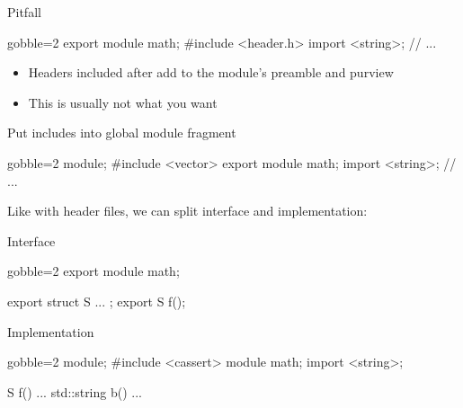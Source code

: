 \begin{frame}[fragile]
  \begin{alertblock}{Pitfall}
    \begin{cppcode*}{gobble=2}
      export module math;
      #include <header.h>
      import <string>;
      // ...
    \end{cppcode*}
  \end{alertblock}
  \begin{block}{}
    \begin{itemize}
    \item Headers included after  add to the module's preamble and purview
    \item This is usually not what you want
    \end{itemize}
  \end{block}
  \begin{exampleblock}{Put includes into global module fragment}
    \begin{cppcode*}{gobble=2}
      module;
      #include <vector>
      export module math;
      import <string>;
      // ...
    \end{cppcode*}
  \end{exampleblock}
\end{frame}

\begin{frame}[fragile,shrink=5]
  \begin{block}{}
    Like with header files, we can split interface and implementation:
  \end{block}
  \begin{exampleblock}{Interface}
    \begin{cppcode*}{gobble=2}
      export module math;

      export struct S { ... };
      export S f();
    \end{cppcode*}
  \end{exampleblock}
  \begin{exampleblock}{Implementation}
    \begin{cppcode*}{gobble=2}
      module;
      #include <cassert>
      module math;
      import <string>;

      S f() { ... }
      std::string b() { ... }
    \end{cppcode*}
  \end{exampleblock}
\end{frame}

